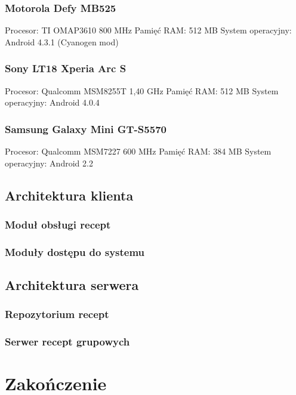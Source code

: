 \documentclass[11pt,a4paper,polish,thesis]{dcsbook}
\begin{document}
\subsection{Motorola Defy MB525}
Procesor: TI OMAP3610 800 MHz
Pamięć RAM: 512 MB
System operacyjny: Android 4.3.1 (Cyanogen mod)
\subsection{Sony LT18 Xperia Arc S}
Procesor: Qualcomm MSM8255T 1,40 GHz
Pamięć RAM: 512 MB
System operacyjny: Android 4.0.4
\subsection{Samsung Galaxy Mini GT-S5570}
Procesor: Qualcomm MSM7227 600 MHz
Pamięć RAM: 384 MB
System operacyjny: Android 2.2
\section{Architektura klienta}
\subsection{Moduł obsługi recept}
\subsection{Moduły dostępu do systemu}

\section{Architektura serwera}
\subsection{Repozytorium recept}
\subsection{Serwer recept grupowych}

\chapter{Zakończenie}
\end{document}

